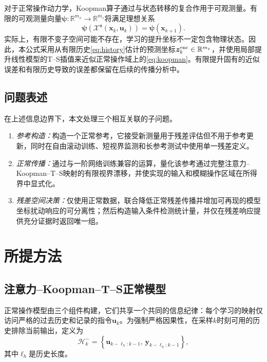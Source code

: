 \documentclass[journal]{IEEEtran}
\newcommand{\1}{\bm 1}
\begin{document}
对于正常操作动力学，Koopman算子通过与状态转移的复合作用于可观测量\cite{brunton2016}。有限的可观测量向量$\bm\psi:\mathbb R^{m_x}\rightarrow\mathbb R^{m_z}$将满足理想关系
\begin{equation}
\bm\psi\!\left(\mathcal X^{\mathfrak n}(\bm x_k,\bm u_k)\right)
=\bm\psi(\bm x_{k+1}).
\label{eq:koopman}
\end{equation}
实际上，有限不变子空间可能不存在，学习的提升坐标不一定包含物理状态。因此，本公式采用从有限历史\eqref{eq:history}估计的预测坐标$\bm z_k^{\rm enc}\in\mathbb R^{m_z}$，并使用局部提升线性模型的T--S插值来近似正常操作域上的\eqref{eq:koopman}。有限提升固有的近似误差和有限历史导致的误差都保留在后续的传播分析中。

\subsection{问题表述}
在上述信息边界下，本文处理三个相互关联的子问题。
\begin{enumerate}
\item \emph{参考构造：}构造一个正常参考，它接受新测量用于残差评估但不用于参考更新，同时在自由滚动训练、短视界监测和长参考测试中使用单一残差定义。

\item \emph{正常传播：}通过与一阶网络训练兼容的运算，量化该参考通过完整注意力--Koopman--T--S映射的有限视界漂移，并使实现的输入和模糊操作区域在所得界中显式化。

\item \emph{残差空间决策：}仅使用正常数据，联合降低正常残差传播并增加可再现的模型坐标扰动响应的可分离性；然后构造输入条件检测统计量，并仅在残差响应提供充分证据时返回唯一组。
\end{enumerate}

\section{所提方法}
\subsection{注意力--Koopman--T--S正常模型}
正常操作模型由三个组件构建，它们共享一个共同的信息纪律：每个学习的映射仅访问严格的过去历史和记录的指令$\bm u_k$。为强制严格因果性，在采样$k$时刻可用的历史排除当前输出，定义为
\begin{equation}
\mathcal H_k^-=
\left\{\bm u_{k-\ell_h:k-1},\,
\bm y_{k-\ell_h:k-1}\right\},
\label{eq:history}
\end{equation}
其中$\ell_h$是历史长度。
\end{document}
